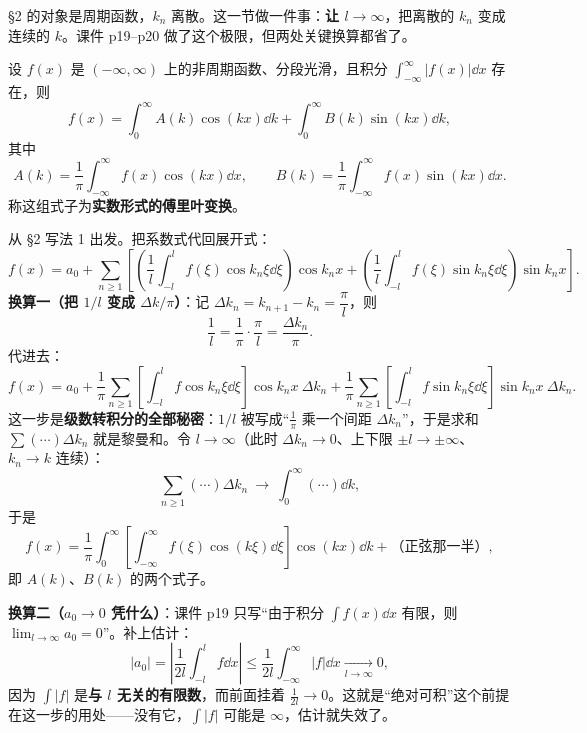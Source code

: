 \documentclass[11pt]{ctexart}
\begin{document}


§2 的对象是周期函数，$k_n$ 离散。这一节做一件事：\textbf{让 $l\to\infty$}，把离散的 $k_n$ 变成连续的 $k$。课件 p19--p20 做了这个极限，但两处关键换算都省了。


设 $f(x)$ 是 $(-\infty,\infty)$ 上的非周期函数、分段光滑，且积分 $\displaystyle\int_{-\infty}^{\infty}|f(x)|\dd x$ 存在，则
\[ f(x)=\int_{0}^{\infty}A(k)\cos(kx)\dd k+\int_{0}^{\infty}B(k)\sin(kx)\dd k ,\]
其中
\[ A(k)=\frac{1}{\pi}\int_{-\infty}^{\infty}f(x)\cos(kx)\dd x,\qquad
B(k)=\frac{1}{\pi}\int_{-\infty}^{\infty}f(x)\sin(kx)\dd x .\]
称这组式子为\textbf{实数形式的傅里叶变换}。


从 §2 写法 1 出发。把系数式代回展开式：
\[
f(x)=a_0+\sum_{n\ge1}\left[\left(\frac{1}{l}\int_{-l}^{l}f(\xi)\cos k_n\xi\dd\xi\right)\cos k_nx
+\left(\frac{1}{l}\int_{-l}^{l}f(\xi)\sin k_n\xi\dd\xi\right)\sin k_nx\right] .
\]
\textbf{换算一（把 $1/l$ 变成 $\Delta k/\pi$）}：记 $\Delta k_n=k_{n+1}-k_n=\dfrac{\pi}{l}$，则
\[ \frac{1}{l}=\frac{1}{\pi}\cdot\frac{\pi}{l}=\frac{\Delta k_n}{\pi} .\]
代进去：
\[
f(x)=a_0+\frac{1}{\pi}\sum_{n\ge1}\left[\int_{-l}^{l}f\cos k_n\xi\dd\xi\right]\cos k_nx\ \Delta k_n
+\frac{1}{\pi}\sum_{n\ge1}\left[\int_{-l}^{l}f\sin k_n\xi\dd\xi\right]\sin k_nx\ \Delta k_n .
\]
这一步是\textbf{级数转积分的全部秘密}：$1/l$ 被写成“$\frac{1}{\pi}$ 乘一个间距 $\Delta k_n$”，于是求和 $\sum(\cdots)\Delta k_n$ 就是黎曼和。令 $l\to\infty$（此时 $\Delta k_n\to0$、上下限 $\pm l\to\pm\infty$、$k_n\to k$ 连续）：
\[ \sum_{n\ge1}(\cdots)\Delta k_n\ \longrightarrow\ \int_0^{\infty}(\cdots)\dd k ,\]
于是
\[ f(x)=\frac{1}{\pi}\int_0^{\infty}\left[\int_{-\infty}^{\infty}f(\xi)\cos(k\xi)\dd\xi\right]\cos(kx)\dd k+\text{（正弦那一半）} ,\]
即 $A(k)$、$B(k)$ 的两个式子。

\textbf{换算二（$a_0\to0$ 凭什么）}：课件 p19 只写“由于积分 $\int f(x)\dd x$ 有限，则 $\lim_{l\to\infty}a_0=0$”。补上估计：
\[ |a_0|=\left|\frac{1}{2l}\int_{-l}^{l}f\dd x\right|\le\frac{1}{2l}\int_{-\infty}^{\infty}|f|\dd x\xrightarrow[l\to\infty]{}0 ,\]
因为 $\int|f|$ 是\textbf{与 $l$ 无关的有限数}，而前面挂着 $\frac{1}{2l}\to0$。这就是“绝对可积”这个前提在这一步的用处——没有它，$\int|f|$ 可能是 $\infty$，估计就失效了。
\end{document}
